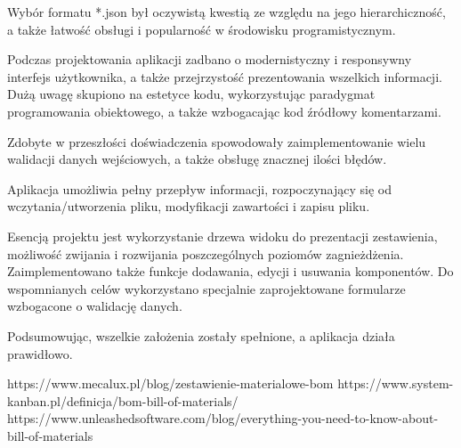 \documentclass[12pt,twoside]{article}
\begin{document}
Wybór formatu *.json był oczywistą kwestią ze względu na jego hierarchiczność, a także łatwość obsługi i popularność w środowisku programistycznym.

Podczas projektowania aplikacji zadbano o modernistyczny i responsywny interfejs użytkownika, a także przejrzystość prezentowania wszelkich informacji. Dużą uwagę skupiono na estetyce kodu, wykorzystując paradygmat programowania obiektowego, a także wzbogacając kod źródłowy komentarzami.

Zdobyte w przeszłości doświadczenia spowodowały zaimplementowanie wielu walidacji danych wejściowych, a także obsługę znacznej ilości błędów.

Aplikacja umożliwia pełny przepływ informacji, rozpoczynający się od wczytania/utworzenia pliku, modyfikacji zawartości i zapisu pliku.

Esencją projektu jest wykorzystanie drzewa widoku do prezentacji zestawienia, możliwość zwijania i rozwijania poszczególnych poziomów zagnieżdżenia. Zaimplementowano także funkcje dodawania, edycji i usuwania komponentów. Do wspomnianych celów wykorzystano specjalnie zaprojektowane formularze wzbogacone o walidację danych.

Podsumowując, wszelkie założenia zostały spełnione, a aplikacja działa prawidłowo.




\clearpage

\begin{thebibliography}{8}
\label{sec:bibliography}
https://www.mecalux.pl/blog/zestawienie-materialowe-bom
https://www.system-kanban.pl/definicja/bom-bill-of-materials/
https://www.unleashedsoftware.com/blog/everything-you-need-to-know-about-bill-of-materials
\end{thebibliography}
\clearpage
\end{document}
